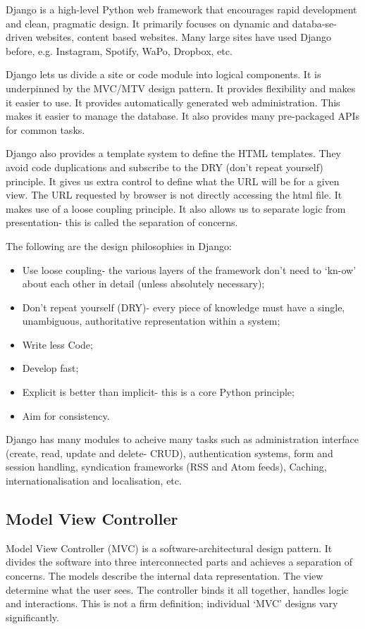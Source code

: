 \documentclass[a4paper, openany]{memoir}
\begin{document}
    Django is a high-level Python web framework that encourages rapid development and clean, pragmatic design. It primarily focuses on dynamic and databa-se-driven websites, content based websites. Many large sites have used Django before, e.g. Instagram, Spotify, WaPo, Dropbox, etc.

    Django lets us divide a site or code module into logical components. It is underpinned by the MVC/MTV design pattern. It provides flexibility and makes it easier to use. It provides automatically generated web administration. This makes it easier to manage the database. It also provides many pre-packaged APIs for common tasks.

    Django also provides a template system to define the HTML templates. They avoid code duplications and subscribe to the DRY (don't repeat yourself) principle. It gives us extra control to define what the URL will be for a given view. The URL requested by browser is not directly accessing the html file. It makes use of a loose coupling principle. It also allows us to separate logic from presentation- this is called the separation of concerns.

    The following are the design philosophies in Django:
    \begin{itemize}
        \item Use loose coupling- the various layers of the framework don't need to `kn-ow' about each other in detail (unless absolutely necessary);
        \item Don't repeat yourself (DRY)- every piece of knowledge must have a single, unambiguous, authoritative representation within a system;
        \item Write less Code;
        \item Develop fast;
        \item Explicit is better than implicit- this is a core Python principle;
        \item Aim for consistency.
    \end{itemize}
    Django has many modules to acheive many tasks such as administration interface (create, read, update and delete- CRUD), authentication systems, form and session handling, syndication frameworks (RSS and Atom feeds), Caching, internationalisation and localisation, etc.

    \subsection{Model View Controller}
    Model View Controller (MVC) is a software-architectural design pattern. It divides the software into three interconnected parts and achieves a separation of concerns. The models describe the internal data representation. The view determine what the user sees. The controller binds it all together, handles logic and interactions. This is not a firm definition; individual `MVC' designs vary significantly.
\end{document}
